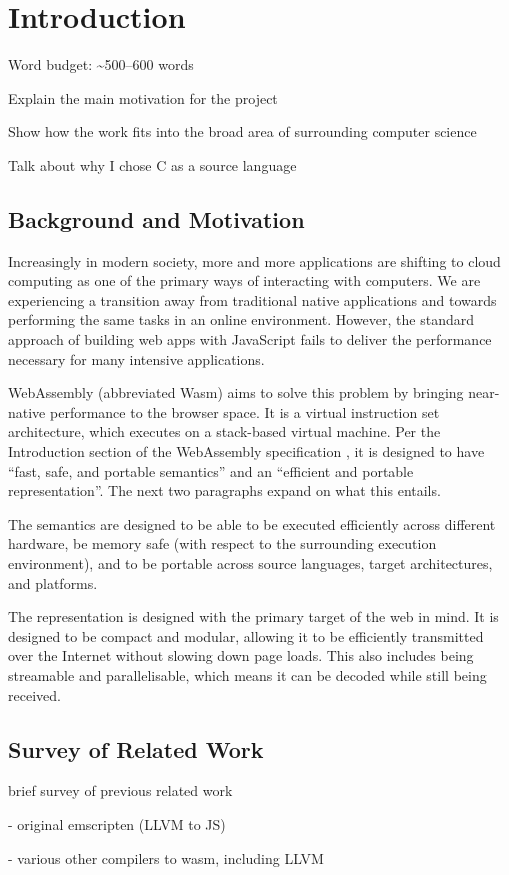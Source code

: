 \documentclass[00-main.tex]{subfiles}
\begin{document}
\chapter{Introduction}

\begin{mrwComment}
Word budget: \textasciitilde 500--600 words
\end{mrwComment}

\begin{mrwComment}
Explain the main motivation for the project

Show how the work fits into the broad area of surrounding computer science
\end{mrwComment}

\begin{mrwComment}
Talk about why I chose C as a source language
\end{mrwComment}

\section{Background and Motivation}

Increasingly in modern society, more and more applications are shifting to cloud computing as one of the primary ways of interacting with computers.
We are experiencing a transition away from traditional native applications and towards performing the same tasks in an online environment.
However, the standard approach of building web apps with JavaScript fails to deliver the performance necessary for many intensive applications.

WebAssembly (abbreviated Wasm) aims to solve this problem by bringing near-native performance to the browser space.
It is a virtual instruction set architecture, which executes on a stack-based virtual machine.
Per the Introduction section of the WebAssembly specification , it is designed to have ``fast, safe, and portable semantics'' and an ``efficient and portable representation''.
The next two paragraphs expand on what this entails.

The semantics are designed to be able to be executed efficiently across different hardware, be memory safe (with respect to the surrounding execution environment), and to be portable across source languages, target architectures, and platforms.

The representation is designed with the primary target of the web in mind.
It is designed to be compact and modular, allowing it to be efficiently transmitted over the Internet without slowing down page loads.
This also includes being streamable and parallelisable, which means it can be decoded while still being received.



\section{Survey of Related Work}

\begin{mrwComment}
brief survey of previous related work

- original emscripten (LLVM to JS)

- various other compilers to wasm, including LLVM
\end{mrwComment}
\end{document}
